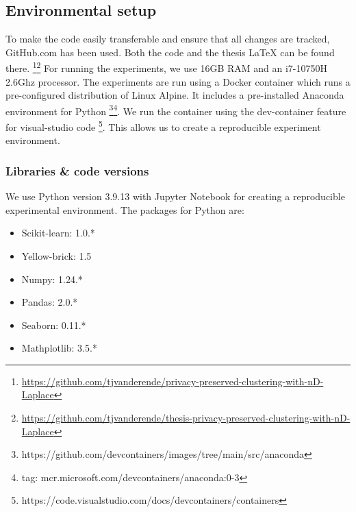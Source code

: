 \subsection{Environmental setup}
To make the code easily transferable and ensure that all changes are tracked, GitHub.com has been used.
Both the code and the thesis LaTeX can be found there. \footnote{\url{https://github.com/tjvanderende/privacy-preserved-clustering-with-nD-Laplace}}\footnote{\url{https://github.com/tjvanderende/thesis-privacy-preserved-clustering-with-nD-Laplace}}
For running the experiments, we use 16GB RAM and an i7-10750H 2.6Ghz processor.
The experiments are run using a Docker container which runs a pre-configured distribution of Linux Alpine.
It includes a pre-installed Anaconda environment for Python \footnote{https://github.com/devcontainers/images/tree/main/src/anaconda}\footnote{tag: mcr.microsoft.com/devcontainers/anaconda:0-3}. \newpage
We run the container using the dev-container feature for visual-studio code \footnote{https://code.visualstudio.com/docs/devcontainers/containers}.
This allows us to create a reproducible experiment environment.
\subsubsection{Libraries \& code versions}
We use Python version 3.9.13 with Jupyter Notebook for creating a reproducible experimental environment.
The packages for Python are:
\begin{itemize}
    \item Scikit-learn: 1.0.*
    \item Yellow-brick: 1.5
    \item Numpy: 1.24.*
    \item Pandas: 2.0.*
    \item Seaborn: 0.11.*
    \item Mathplotlib: 3.5.*
\end{itemize}

